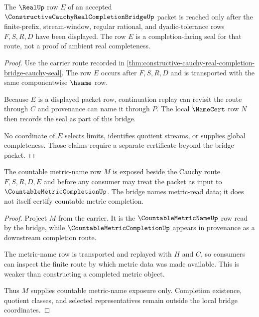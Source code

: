 \begin{theorem}
\label{thm:constructive-cauchy-real-completion-bridge-real-seal}
The $\RealUp$ row $E$ of an accepted $\ConstructiveCauchyRealCompletionBridgeUp$ packet is reached only after the finite-prefix, stream-window, regular rational, and dyadic-tolerance rows $F,S,R,D$ have been displayed. The row $E$ is a completion-facing seal for that route, not a proof of ambient real completeness.
\end{theorem}
\begin{proof}
Use the carrier route recorded in \autoref{thm:constructive-cauchy-real-completion-bridge-cauchy-seal}. The row $E$ occurs after $F,S,R,D$ and is transported with the same componentwise $\hsame$ row.

Because $E$ is a displayed packet row, continuation replay can revisit the route through $C$ and provenance can name it through $P$. The local $\NameCert$ row $N$ then records the seal as part of this bridge.

No coordinate of $E$ selects limits, identifies quotient streams, or supplies global completeness. Those claims require a separate certificate beyond the bridge packet.
\end{proof}

\begin{theorem}
\label{thm:constructive-cauchy-real-completion-bridge-countable-metric}
The countable metric-name row $M$ is exposed beside the Cauchy route $F,S,R,D,E$ and before any consumer may treat the packet as input to $\CountableMetricCompletionUp$. The bridge names metric-read data; it does not itself certify countable metric completion.
\end{theorem}
\begin{proof}
Project $M$ from the carrier. It is the $\CountableMetricNameUp$ row read by the bridge, while $\CountableMetricCompletionUp$ appears in provenance as a downstream completion route.

The metric-name row is transported and replayed with $H$ and $C$, so consumers can inspect the finite route by which metric data was made available. This is weaker than constructing a completed metric object.

Thus $M$ supplies countable metric-name exposure only. Completion existence, quotient classes, and selected representatives remain outside the local bridge coordinates.
\end{proof}

